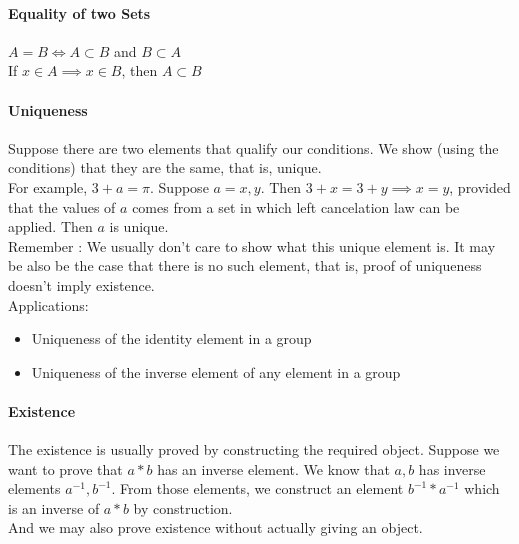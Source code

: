 \paragraph{Equality of two Sets}
$A = B \iff A \subset B$ and $B \subset A$\\
If $x \in A \implies x \in B$, then $A \subset B$
\paragraph{Uniqueness}
	Suppose there are two elements that qualify our conditions. We show (using the conditions) that they are the same, that is, unique.\\

	For example, $3 + a = \pi$. Suppose $a = x,y$. Then $3 + x = 3 + y \implies x = y$, provided that the values of $a$ comes from a set in which left cancelation law can be applied. Then $a$ is unique.\\

	Remember : We usually don't care to show what this unique element is. It may be also be the case that there is no such element, that is, proof of uniqueness doesn't imply existence.\\

	Applications:
\begin{itemize}
	\item Uniqueness of the identity element in a group
	\item Uniqueness of the inverse element of any element in a group
\end{itemize}

\paragraph{Existence}
	The existence is usually proved by constructing the required object. Suppose we want to prove that $a\ast b$ has an inverse element. We know that $a,b$ has inverse elements $a^{-1},b^{-1}$. From those elements, we construct an element $b^{-1} \ast a^{-1}$ which is an inverse of $a \ast b$ by construction.\\

	And we may also prove existence without actually giving an object.\\ %

\pagebreak

